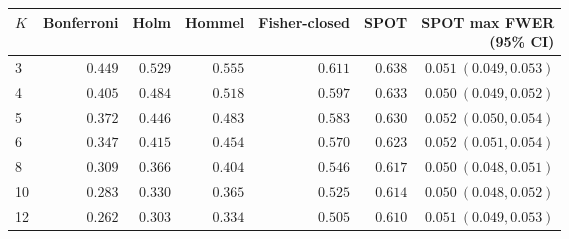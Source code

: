 \begin{tabular}{@{}lrrrrrr@{}}
\toprule
$K$ & Bonferroni & Holm & Hommel & Fisher-closed & SPOT & \shortstack{SPOT max FWER\\(95\% CI)} \\
\midrule
3 & $0.449$ & $0.529$ & $0.555$ & $0.611$ & $\mathbf{0.638}$ & $0.051\ (0.049,0.053)$ \\
4 & $0.405$ & $0.484$ & $0.518$ & $0.597$ & $\mathbf{0.633}$ & $0.050\ (0.049,0.052)$ \\
5 & $0.372$ & $0.446$ & $0.483$ & $0.583$ & $\mathbf{0.630}$ & $0.052\ (0.050,0.054)$ \\
6 & $0.347$ & $0.415$ & $0.454$ & $0.570$ & $\mathbf{0.623}$ & $0.052\ (0.051,0.054)$ \\
8 & $0.309$ & $0.366$ & $0.404$ & $0.546$ & $\mathbf{0.617}$ & $0.050\ (0.048,0.051)$ \\
10 & $0.283$ & $0.330$ & $0.365$ & $0.525$ & $\mathbf{0.614}$ & $0.050\ (0.048,0.052)$ \\
12 & $0.262$ & $0.303$ & $0.334$ & $0.505$ & $\mathbf{0.610}$ & $0.051\ (0.049,0.053)$ \\
\bottomrule
\end{tabular}
